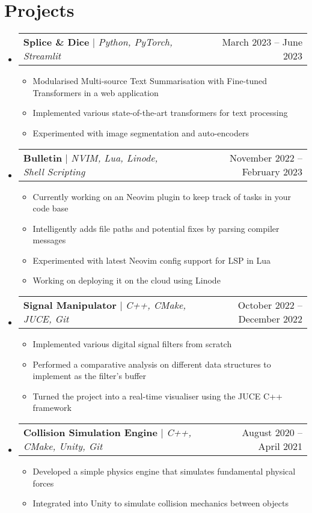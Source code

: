 \documentclass[letterpaper,11pt]{article}
\makeatletter
\newcommand{\resumeItem}[1]{
  \item\small{
    {#1 \vspace{-2pt}}
  }
}
\newcommand{\resumeProjectHeading}[2]{
    \item
    \begin{tabular*}{0.97\textwidth}{l@{\extracolsep{\fill}}r}
      \small#1 & #2 \\
    \end{tabular*}\vspace{-7pt}
}
\newcommand{\resumeSubHeadingListStart}{\begin{itemize}[leftmargin=0.15in, label={}]}
\newcommand{\resumeSubHeadingListEnd}{\end{itemize}}
\newcommand{\resumeItemListStart}{\begin{itemize}}
\newcommand{\resumeItemListEnd}{\end{itemize}\vspace{-5pt}}
\makeatother
\begin{document}
\section{Projects}
    \resumeSubHeadingListStart

    \resumeProjectHeading
          {\textbf{Splice \& Dice} $|$ \emph{Python, PyTorch, Streamlit}}{March 2023 -- June 2023}
          \resumeItemListStart
            \resumeItem{Modularised Multi-source Text Summarisation with Fine-tuned Transformers in a web application}
            \resumeItem{Implemented various state-of-the-art transformers for text processing}
            \resumeItem{Experimented with image segmentation and auto-encoders}
          \resumeItemListEnd
    
    \resumeProjectHeading
          {\textbf{Bulletin} $|$ \emph{NVIM, Lua, Linode, Shell Scripting}}{November 2022 -- February 2023}
          \resumeItemListStart
            \resumeItem{Currently working on an Neovim plugin to keep track of tasks in your code base}
            \resumeItem{Intelligently adds file paths and potential fixes by parsing compiler messages}
            \resumeItem{Experimented with latest Neovim config support for LSP in Lua}
            \resumeItem{Working on deploying it on the cloud using Linode}
          \resumeItemListEnd
          
    \resumeProjectHeading
          {\textbf{Signal Manipulator} $|$ \emph{C++, CMake, JUCE, Git}}{October 2022 -- December 2022}
          \resumeItemListStart
            \resumeItem{Implemented various digital signal filters from scratch}
            \resumeItem{Performed a comparative analysis on different data structures to implement as the filter’s buffer}
            \resumeItem{Turned the project into a real-time visualiser using the JUCE C++ framework}
          \resumeItemListEnd
          
      \resumeProjectHeading
          {\textbf{Collision Simulation Engine} $|$ \emph{C++, CMake, Unity, Git}}{August 2020 -- April 2021}
          \resumeItemListStart
            \resumeItem{Developed a simple physics engine that simulates fundamental physical forces}
            \resumeItem{Integrated into Unity to simulate collision mechanics between objects}
          \resumeItemListEnd

    \resumeSubHeadingListEnd



%
\end{document}
